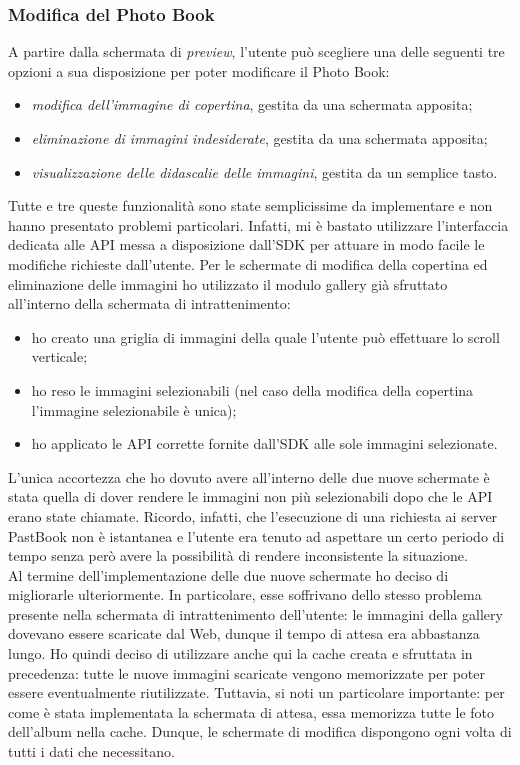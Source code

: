 			\subsubsection{Modifica del Photo Book}
				A partire dalla schermata di \emph{preview}, l'utente può scegliere una delle seguenti tre opzioni a sua
				disposizione per poter modificare il Photo Book:
				\begin{itemize}
					\item \emph{modifica dell'immagine di copertina}, gestita da una schermata apposita;
					\item \emph{eliminazione di immagini indesiderate}, gestita da una schermata apposita;
					\item \emph{visualizzazione delle didascalie delle immagini}, gestita da un semplice tasto.
				\end{itemize}
				Tutte e tre queste funzionalità sono state semplicissime da implementare e non hanno presentato problemi particolari.
				Infatti, mi è bastato utilizzare l'interfaccia dedicata alle API messa a disposizione dall'SDK per attuare in modo
				facile le modifiche richieste dall'utente. Per le schermate di modifica della copertina ed eliminazione delle
				immagini ho utilizzato il modulo gallery già sfruttato all'interno della schermata di intrattenimento:
				\begin{itemize}
					\item ho creato una griglia di immagini della quale l'utente può effettuare lo scroll verticale;
					\item ho reso le immagini selezionabili (nel caso della modifica della copertina l'immagine selezionabile è
					unica);
					\item ho applicato le API corrette fornite dall'SDK alle sole immagini selezionate.
				\end{itemize}
				L'unica accortezza che ho dovuto avere all'interno delle due nuove schermate è stata quella di dover rendere le
				immagini non più selezionabili dopo che le API erano state chiamate. Ricordo, infatti, che l'esecuzione di una
				richiesta ai server PastBook non è istantanea e l'utente era tenuto ad aspettare un certo periodo di tempo senza però
				avere la possibilità di rendere inconsistente la situazione.\\
				
				\noindent Al termine dell'implementazione delle due nuove schermate ho deciso di migliorarle ulteriormente. In
				particolare, esse soffrivano dello stesso problema presente nella schermata di intrattenimento dell'utente: le
				immagini della gallery dovevano essere scaricate dal Web, dunque il tempo di attesa era abbastanza lungo. Ho quindi
				deciso di utilizzare anche qui la cache creata e sfruttata in precedenza: tutte le nuove immagini scaricate vengono
				memorizzate per poter essere eventualmente riutilizzate. Tuttavia, si noti un particolare importante: per come è
				stata implementata la schermata di attesa, essa memorizza tutte le foto dell'album nella cache. Dunque, le schermate
				di modifica dispongono ogni volta di tutti i dati che necessitano.
